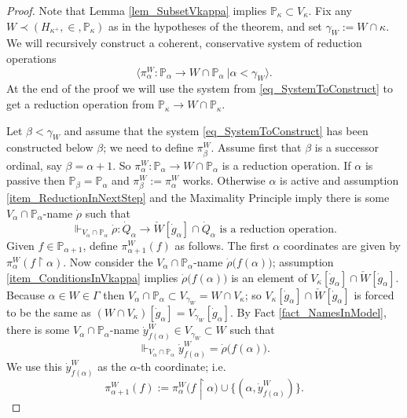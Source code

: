 \documentclass{amsart}
\begin{document}
\begin{proof}
Note that Lemma \ref{lem_SubsetVkappa} implies $\mathbb{P}_\kappa \subset V_\kappa$.  Fix any $W \prec (H_{\kappa^+}, \in, \mathbb{P}_\kappa)$ as in the hypotheses of the theorem, and set $\gamma_W:= W \cap \kappa$.  We will  recursively construct a coherent, conservative system of reduction operations
\begin{equation}\label{eq_SystemToConstruct}
\langle \pi^W_\alpha: \mathbb{P}_\alpha \to W \cap \mathbb{P}_\alpha \ | \alpha < \gamma_W \rangle.
\end{equation}
At the end of the proof we will use the system from \eqref{eq_SystemToConstruct} to get a reduction operation from $\mathbb{P}_\kappa \to W \cap \mathbb{P}_\kappa$.

Let $\beta < \gamma_W$ and assume that the system \eqref{eq_SystemToConstruct} has been constructed below $\beta$; we need to define $\pi^W_\beta$.  Assume first that $\beta$ is a successor ordinal, say $\beta = \alpha+1$.  So $\pi^W_\alpha: \mathbb{P}_\alpha \to W \cap \mathbb{P}_\alpha$ is a reduction operation.  If $\alpha$ is passive then $\mathbb{P}_\beta = \mathbb{P}_\alpha$ and $\pi^W_\beta:= \pi^W_\alpha$ works.  Otherwise $\alpha$ is active and assumption \ref{item_ReductionInNextStep} and the Maximality Principle imply there is some $V_\alpha \cap \mathbb{P}_\alpha$-name $\dot{\rho}$ such that
\begin{equation*}
\Vdash_{V_\alpha \cap \mathbb{P}_\alpha} \dot{\rho}: \dot{Q}_\alpha \to \check{W}[\dot{g}_\alpha] \cap \dot{Q}_\alpha \text{ is a reduction operation}.
\end{equation*}
Given $f \in \mathbb{P}_{\alpha+1}$, define $\pi^W_{\alpha+1}(f)$ as follows.  The first $\alpha$ coordinates are given by $\pi^W_\alpha(f \restriction \alpha)$.  Now consider the $V_\alpha \cap \mathbb{P}_\alpha$-name $\dot{\rho}\big( f(\alpha) \big)$; assumption \ref{item_ConditionsInVkappa} implies $\dot{\rho}\big( f(\alpha) \big)$ is an element of $V_\kappa[\dot{g}_\alpha] \cap \check{W}[\dot{g}_\alpha]$.  Because $\alpha \in W \in \Gamma$ then $V_\alpha \cap \mathbb{P}_\alpha \subset V_{\gamma_W} = W \cap V_\kappa$; so $V_\kappa[\dot{g}_\alpha] \cap \check{W}[\dot{g}_\alpha]$ is forced to be the same as $(W \cap V_\kappa)[\dot{g}_\alpha] = V_{\gamma_W}[\dot{g}_\alpha]$.  By Fact \ref{fact_NamesInModel}, there is some $V_\alpha \cap \mathbb{P}_\alpha$-name $\dot{y}^W_{f(\alpha)} \in V_{\gamma_W} \subset W$ such that 
\begin{equation}\label{eq_NamesAreEqual}
\Vdash_{V_\alpha \cap \mathbb{P}_\alpha} \dot{y}^W_{f(\alpha)} = \dot{\rho}\big( f(\alpha) \big).
\end{equation}
We use this $\dot{y}^W_{f(\alpha)}$ as the $\alpha$-th coordinate; i.e.\
\begin{equation*}
\pi^W_{\alpha+1}(f) := \pi^W_{\alpha}\big( f \restriction \alpha \big) \cup \{ (\alpha, \dot{y}^W_{f(\alpha)} ) \}.
\end{equation*}


\end{proof}
\end{document}
